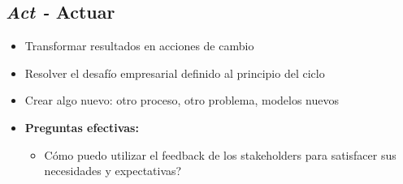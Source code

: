 \subsection{\textit{Act - }Actuar}
\begin{itemize}
    \item {Transformar resultados en acciones de cambio}
    \item {Resolver el desafío empresarial definido al principio del ciclo}
    \item {Crear algo nuevo: otro proceso, otro problema, modelos nuevos}
    \item {\textbf{Preguntas efectivas: }
    \begin{itemize}
        \item {Cómo puedo utilizar el feedback de los stakeholders para satisfacer sus necesidades y expectativas?}
    \end{itemize}}
\end{itemize}

\newpage